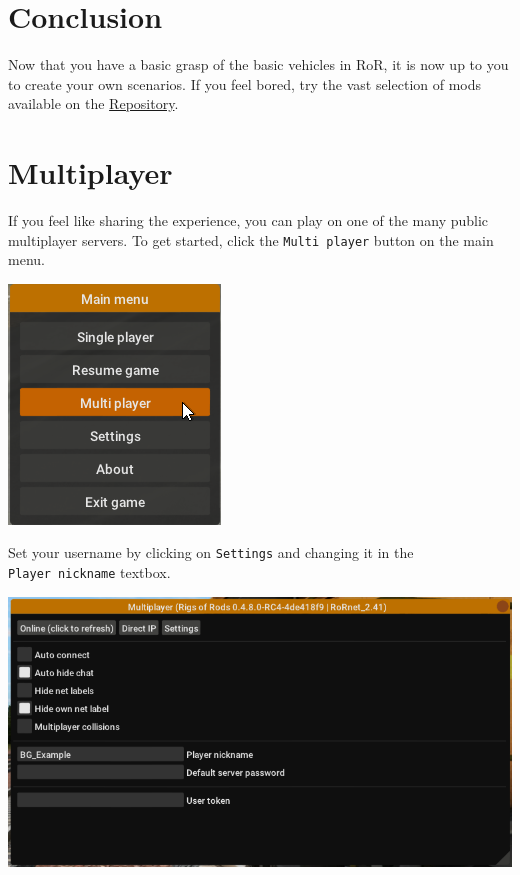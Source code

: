 \hypertarget{conclusion}{%
\section{Conclusion}\label{conclusion}}

Now that you have a basic grasp of the basic vehicles in RoR, it is now
up to you to create your own scenarios. If you feel bored, try the vast
selection of mods available on the
\href{https://forum.rigsofrods.org/resources/}{Repository}.

\hypertarget{multiplayer}{%
\section{Multiplayer}\label{multiplayer}}

If you feel like sharing the experience, you can play on one of the many
public multiplayer servers. To get started, click the
\texttt{Multi\ player} button on the main menu.

\includegraphics{images/bg-mp1.png}

Set your username by clicking on \texttt{Settings} and changing it in
the \texttt{Player\ nickname} textbox.

\includegraphics{images/bg-mp2.png}

